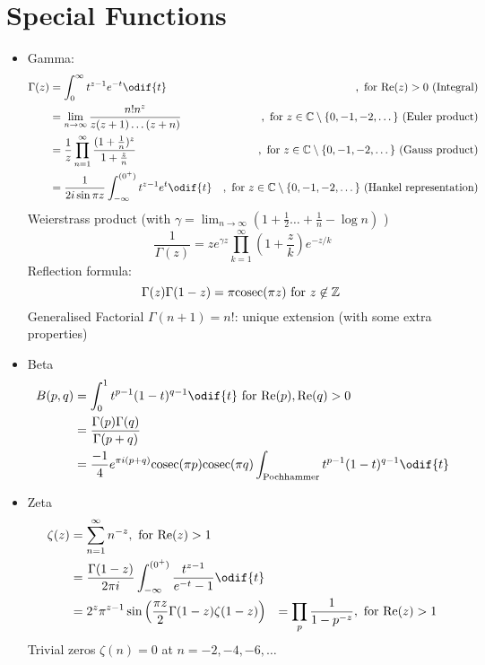 \section{Special Functions}
\begin{itemize}
    \item Gamma: 
    \begin{align*}
        \Gamma(z) &= \int_0^\infty t^{z-1}e^{-t} \odif{t} &,\text{ for $\Re(z) > 0$ (Integral)} \\
        &= \lim_{n\to\infty} \frac{n! n^z}{z(z+1)\dots(z+n)} &,\text{ for $z\in \C \setminus \{0,-1,-2,\dots\}$ (Euler product)} \\
        &= \frac{1}{z}\prod_{n=1}^\infty \frac{(1+\frac{1}{n})^z}{1+\frac{z}{n}} &,\text{ for $z\in \C \setminus \{0,-1,-2,\dots\}$ (Gauss product)} \\
        &= \frac{1}{2i\sin\pi z} \int_{-\infty}^{(0^+)} t^{z-1}e^{t} \odif{t}  &,\text{ for $z\in \C \setminus \{0,-1,-2,\dots\}$ (Hankel representation)}  
    \end{align*}
    Weierstrass product (with $\gamma = \lim_{n\to\infty} \left(1+\frac{1}{2}\dots+\frac{1}{n}-\log n\right)$ )
    \[\frac{1}{\Gamma(z)} = ze^{\gamma z} \prod_{k=1}^\infty \left({1+\frac{z}{k}}\right) e^{-z/k}\]
    Reflection formula: 
    \[\Gamma(z)\Gamma(1-z) = \pi \text{cosec}(\pi z) \text{ for $z\not\in \mathbb{Z}$ } \]
    Generalised Factorial $\Gamma(n+1) = n!$: unique extension (with some extra properties)
    \item Beta \begin{align*}
        B(p,q) &= \int_0^1 t^{p-1}(1-t)^{q-1} \odif{t} \text{ for $\Re(p), \Re(q) > 0$} \\
        &= \frac{\Gamma(p)\Gamma(q)}{\Gamma(p+q)} \\
        &= \frac{-1}{4} e^{\pi i (p+q)} \text{cosec}(\pi p)\text{cosec}(\pi q) \int_{\text{Pochhammer}} t^{p-1}(1-t)^{q-1} \odif{t}
    \end{align*}
    \item Zeta 
    \begin{align*}
        \zeta(z) &= \sum_{n=1}^\infty n^{-z},  \text{ for $\Re(z)> 1$} \\
        &= \frac{\Gamma(1-z)}{2\pi i} \int_{-\infty}^{(0^+)} \frac{t^{z-1}}{e^{-t}-1} \odif{t} \\
        &= 2^z \pi^{z-1} \sin\left(\frac{\pi z}{2}\Gamma(1-z)\zeta(1-z) \right) 
        &= \prod_{p}\frac{1}{1-p^{-z}}, \text{ for $\Re(z)> 1$} 
    \end{align*}
    Trivial zeros $\zeta(n)=0$ at $n=-2,-4,-6,\dots$
\end{itemize}

